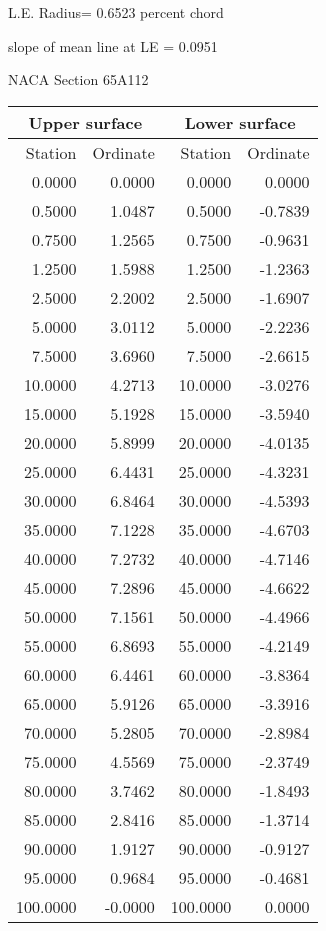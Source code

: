 \documentclass[11pt]{book}
\begin{document}
L.E. Radius=  0.6523 percent chord


 slope of mean line at LE =  0.0951
 \newpage
  \label{s65A112}
 \begin{Large}
 NACA Section 65A112
 \end{Large}
  
 \vspace{8mm}
 \begin{tabular}{|r|r|r|r|} \hline 
 \multicolumn{2}{|c|}{Upper surface} & \multicolumn{2}{|c|}{Lower surface} \\
 \hline
 Station & Ordinate & Station & Ordinate \\
 \hline
0.0000 & 0.0000 & 0.0000 & 0.0000 \\
0.5000 & 1.0487 & 0.5000 & -0.7839 \\
0.7500 & 1.2565 & 0.7500 & -0.9631 \\
1.2500 & 1.5988 & 1.2500 & -1.2363 \\
2.5000 & 2.2002 & 2.5000 & -1.6907 \\
5.0000 & 3.0112 & 5.0000 & -2.2236 \\
7.5000 & 3.6960 & 7.5000 & -2.6615 \\
10.0000 & 4.2713 & 10.0000 & -3.0276 \\
15.0000 & 5.1928 & 15.0000 & -3.5940 \\
20.0000 & 5.8999 & 20.0000 & -4.0135 \\
25.0000 & 6.4431 & 25.0000 & -4.3231 \\
30.0000 & 6.8464 & 30.0000 & -4.5393 \\
35.0000 & 7.1228 & 35.0000 & -4.6703 \\
40.0000 & 7.2732 & 40.0000 & -4.7146 \\
45.0000 & 7.2896 & 45.0000 & -4.6622 \\
50.0000 & 7.1561 & 50.0000 & -4.4966 \\
55.0000 & 6.8693 & 55.0000 & -4.2149 \\
60.0000 & 6.4461 & 60.0000 & -3.8364 \\
65.0000 & 5.9126 & 65.0000 & -3.3916 \\
70.0000 & 5.2805 & 70.0000 & -2.8984 \\
75.0000 & 4.5569 & 75.0000 & -2.3749 \\
80.0000 & 3.7462 & 80.0000 & -1.8493 \\
85.0000 & 2.8416 & 85.0000 & -1.3714 \\
90.0000 & 1.9127 & 90.0000 & -0.9127 \\
95.0000 & 0.9684 & 95.0000 & -0.4681 \\
100.0000 & -0.0000 & 100.0000 & 0.0000 \\
 \hline 
 \end{tabular}
\end{document}
